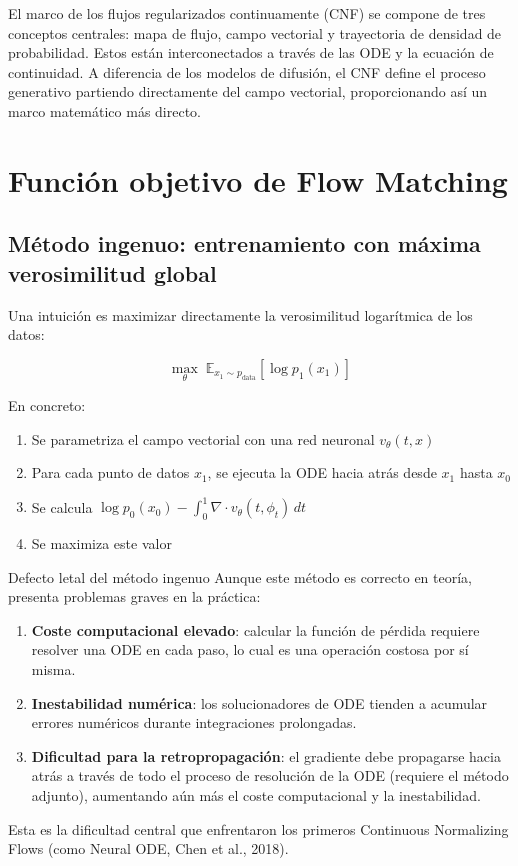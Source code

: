 \documentclass[a4paper]{article}
\begin{document}
El marco de los flujos regularizados continuamente (CNF) se compone de tres conceptos centrales: mapa de flujo, campo vectorial y trayectoria de densidad de probabilidad. Estos están interconectados a través de las ODE y la ecuación de continuidad. A diferencia de los modelos de difusión, el CNF define el proceso generativo partiendo directamente del campo vectorial, proporcionando así un marco matemático más directo.


\section{Función objetivo de Flow Matching}

\subsection{Método ingenuo: entrenamiento con máxima verosimilitud global}

Una intuición es maximizar directamente la verosimilitud logarítmica de los datos:

$$\max_\theta \; \mathbb{E}_{x_1 \sim p_{\text{data}}} \left[ \log p_1(x_1) \right]$$

En concreto:
\begin{enumerate}
    \item Se parametriza el campo vectorial con una red neuronal $v_\theta(t, x)$
    \item Para cada punto de datos $x_1$, se ejecuta la ODE hacia atrás desde $x_1$ hasta $x_0$
    \item Se calcula $\log p_0(x_0) - \int_0^1 \nabla \cdot v_\theta(t, \phi_t) \, dt$
    \item Se maximiza este valor
\end{enumerate}

\begin{warningbox}{Defecto letal del método ingenuo}
Aunque este método es correcto en teoría, presenta problemas graves en la práctica:
\begin{enumerate}
    \item \textbf{Coste computacional elevado}: calcular la función de pérdida requiere resolver una ODE en cada paso, lo cual es una operación costosa por sí misma.
    \item \textbf{Inestabilidad numérica}: los solucionadores de ODE tienden a acumular errores numéricos durante integraciones prolongadas.
    \item \textbf{Dificultad para la retropropagación}: el gradiente debe propagarse hacia atrás a través de todo el proceso de resolución de la ODE (requiere el método adjunto), aumentando aún más el coste computacional y la inestabilidad.
\end{enumerate}
Esta es la dificultad central que enfrentaron los primeros Continuous Normalizing Flows (como Neural ODE, Chen et al., 2018).
\end{warningbox}
\end{document}
